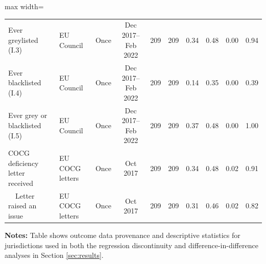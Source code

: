\begin{table}[ht!]
\begin{adjustbox}{max width=\textwidth}
\begin{tabular}{lllcrrrrrr}
Ever greylisted (I.3) & EU Council & Once & Dec 2017--Feb 2022 & 209 & 209 & 0.34 & 0.48 & 0.00 & 0.94 \\
Ever blacklisted (I.4) & EU Council & Once & Dec 2017--Feb 2022 & 209 & 209 & 0.14 & 0.35 & 0.00 & 0.39 \\
Ever grey or blacklisted (I.5) & EU Council & Once & Dec 2017--Feb 2022 & 209 & 209 & 0.37 & 0.48 & 0.00 & 1.00 \\
COCG deficiency letter received & EU COCG letters & Once & Oct 2017 & 209 & 209 & 0.34 & 0.48 & 0.02 & 0.91 \\
~~Letter raised an issue & EU COCG letters & Once & Oct 2017 & 209 & 209 & 0.31 & 0.46 & 0.02 & 0.82 \\
\bottomrule
\end{tabular}
\end{adjustbox}
\begin{flushleft}\scriptsize
{\bf Notes:}  Table shows outcome data provenance and descriptive statistics for jurisdictions used in both the regression discontinuity and difference-in-difference analyses in Section \ref{sec:results}.
\end{flushleft}
\end{table}
